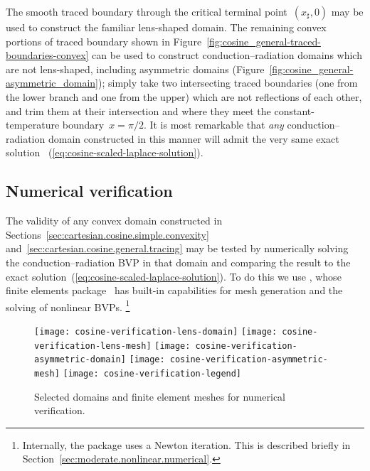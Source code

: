 The smooth traced boundary through the critical terminal point~$(x_\sharp, 0)$
may be used to construct the familiar lens-shaped domain.
The remaining convex portions of traced boundary
shown in Figure~\ref{fig:cosine_general-traced-boundaries-convex}
can be used to construct conduction--radiation domains
which are not lens-shaped, including asymmetric domains
(Figure~\ref{fig:cosine_general-asymmetric_domain});
simply take two intersecting traced boundaries
(one from the lower branch and one from the upper)
which are not reflections of each other,
and trim them at their intersection
and where they meet the constant-temperature boundary~$x = \pi/2$.
It is most remarkable that
\emph{any} conduction--radiation domain constructed in this manner
will admit the very same exact solution~%
  (\ref{eq:cosine-scaled-laplace-solution}).

\subsection{Numerical verification}
\label{sec:cartesian.cosine.verification}

The validity of any convex domain constructed
in Sections~\ref{sec:cartesian.cosine.simple.convexity}
and~\ref{sec:cartesian.cosine.general.tracing}
may be tested by numerically solving the conduction--radiation BVP
in that domain and comparing the result
to the exact solution~(\ref{eq:cosine-scaled-laplace-solution}).
To do this we use ,
whose finite elements package~
has built-in capabilities for mesh generation
and the solving of nonlinear BVPs.%
\footnote{
  Internally, the package uses a Newton iteration.
  This is described briefly in Section~\ref{sec:moderate.nonlinear.numerical}.
}

\begin{figure}
  \newcommand*{\legendoffsetheight}{0.1\textwidth}
  \centering
  \texttt{[image: cosine-verification-lens-domain]}
  \texttt{[image: cosine-verification-lens-mesh]}
  \hfill
  \texttt{[image: cosine-verification-asymmetric-domain]}
  \texttt{[image: cosine-verification-asymmetric-mesh]}
  \texttt{[image: cosine-verification-legend]}
  \caption{
    Selected domains and finite element meshes for numerical verification.
  }
  \label{fig:cosine-verification-domain-meshes}
\end{figure}


